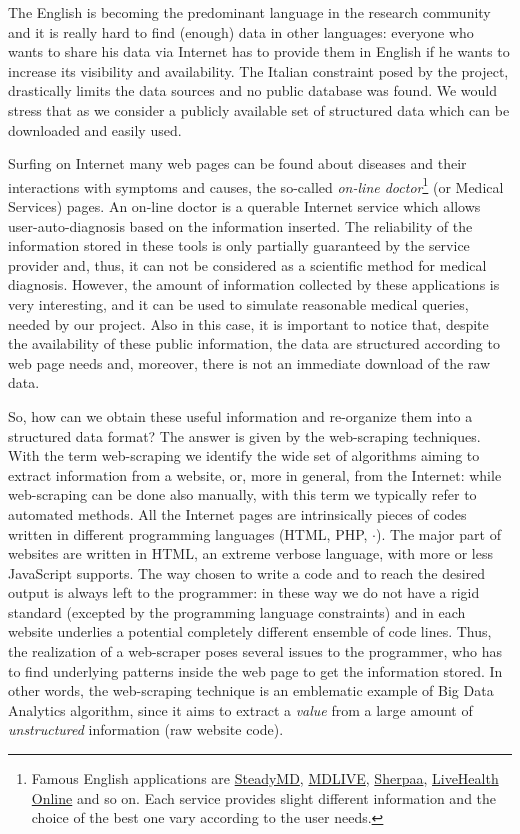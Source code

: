 \documentclass{standalone}
\begin{document}
The English is becoming the predominant language in the research community and it is really hard to find (enough) data in other languages: everyone who wants to share his data via Internet has to provide them in English if he wants to increase its visibility and availability.
The Italian constraint posed by the project, drastically limits the data sources and no public database was found.
We would stress that as  we consider a publicly available set of structured data which can be downloaded and easily used.

Surfing on Internet many web pages can be found about diseases and their interactions with symptoms and causes, the so-called \emph{on-line doctor}\footnote{
  Famous English applications are \href{https://www.steadymd.com/?utm_source=bestonlinedoctors&utm_medium=partner&utm_campaign=bizdev}{SteadyMD}, \href{https://www.mdlive.com/}{MDLIVE}, \href{https://sherpaa.com/}{Sherpaa}, \href{https://livehealthonline.com/}{LiveHealth Online} and so on.
  Each service provides slight different information and the choice of the best one vary according to the user needs.
} (or Medical Services) pages.
An on-line doctor is a querable Internet service which allows user-auto-diagnosis based on the information inserted.
The reliability of the information stored in these tools is only partially guaranteed by the service provider and, thus, it can not be considered as a scientific method for medical diagnosis.
However, the amount of information collected by these applications is very interesting, and it can be used to simulate reasonable medical queries, needed by our project.
Also in this case, it is important to notice that, despite the availability of these public information, the data are structured according to web page needs and, moreover, there is not an immediate download of the raw data.

So, how can we obtain these useful information and re-organize them into a structured data format?
The answer is given by the \textsf{web-scraping} techniques.
With the term \textsf{web-scraping} we identify the wide set of algorithms aiming to extract information from a website, or, more in general, from the Internet: while \textsf{web-scraping} can be done also manually, with this term we typically refer to automated methods.
All the Internet pages are intrinsically pieces of codes written in different programming languages (\textsf{HTML}, \textsf{PHP}, $\cdot$).
The major part of websites are written in \textsf{HTML}, an extreme verbose language, with more or less \textsf{JavaScript} supports.
The way chosen to write a code and to reach the desired output is always left to the programmer: in these way we do not have a rigid standard (excepted by the programming language constraints) and in each website underlies a potential completely different ensemble of code lines.
Thus, the realization of a web-scraper poses several issues to the programmer, who has to find underlying patterns inside the web page to get the information stored.
In other words, the \textsf{web-scraping} technique is an emblematic example of Big Data Analytics algorithm, since it aims to extract a \emph{value} from a large amount of \emph{unstructured} information (raw website code).
\end{document}
